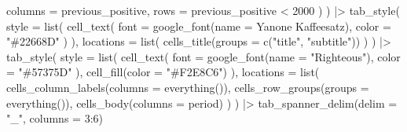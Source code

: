 \documentclass[
]{article}
\newenvironment{Shaded}{\begin{snugshade}}{\end{snugshade}}
\newcommand{\AttributeTok}[1]{\textcolor[rgb]{0.77,0.63,0.00}{#1}}
\newcommand{\DecValTok}[1]{\textcolor[rgb]{0.00,0.00,0.81}{#1}}
\newcommand{\FunctionTok}[1]{\textcolor[rgb]{0.00,0.00,0.00}{#1}}
\newcommand{\NormalTok}[1]{#1}
\newcommand{\SpecialCharTok}[1]{\textcolor[rgb]{0.00,0.00,0.00}{#1}}
\newcommand{\StringTok}[1]{\textcolor[rgb]{0.31,0.60,0.02}{#1}}
\begin{document}
\begin{Shaded}
\begin{Highlighting}[]
      \AttributeTok{columns =}\NormalTok{ previous\_positive,}
      \AttributeTok{rows =}\NormalTok{ previous\_positive }\SpecialCharTok{\textless{}} \DecValTok{2000}
\NormalTok{    )}
\NormalTok{  ) }\SpecialCharTok{|\textgreater{}} 
  \FunctionTok{tab\_style}\NormalTok{(}
      \AttributeTok{style =} \FunctionTok{list}\NormalTok{(}
        \FunctionTok{cell\_text}\NormalTok{(}
          \AttributeTok{font =} \FunctionTok{google\_font}\NormalTok{(}\AttributeTok{name =} \StringTok{\textquotesingle{}Yanone Kaffeesatz\textquotesingle{}}\NormalTok{), }
          \AttributeTok{color =} \StringTok{"\#22668D"}
\NormalTok{        )}
\NormalTok{      ),}
      \AttributeTok{locations =} \FunctionTok{list}\NormalTok{(}
        \FunctionTok{cells\_title}\NormalTok{(}\AttributeTok{groups =} \FunctionTok{c}\NormalTok{(}\StringTok{"title"}\NormalTok{, }\StringTok{"subtitle"}\NormalTok{))}
\NormalTok{      )}
\NormalTok{  ) }\SpecialCharTok{|\textgreater{}} 
  \FunctionTok{tab\_style}\NormalTok{(}
    \AttributeTok{style =} \FunctionTok{list}\NormalTok{(}
      \FunctionTok{cell\_text}\NormalTok{(}
        \AttributeTok{font =} \FunctionTok{google\_font}\NormalTok{(}\AttributeTok{name =} \StringTok{"Righteous"}\NormalTok{),}
        \AttributeTok{color =} \StringTok{"\#57375D"}
\NormalTok{      ),}
      \FunctionTok{cell\_fill}\NormalTok{(}\AttributeTok{color =} \StringTok{"\#F2E8C6"}\NormalTok{)}
\NormalTok{    ),}
    \AttributeTok{locations =} \FunctionTok{list}\NormalTok{(}
      \FunctionTok{cells\_column\_labels}\NormalTok{(}\AttributeTok{columns =} \FunctionTok{everything}\NormalTok{()),}
      \FunctionTok{cells\_row\_groups}\NormalTok{(}\AttributeTok{groups =} \FunctionTok{everything}\NormalTok{()),}
      \FunctionTok{cells\_body}\NormalTok{(}\AttributeTok{columns =}\NormalTok{ period)}
\NormalTok{    )}
\NormalTok{  ) }\SpecialCharTok{|\textgreater{}} 
  \FunctionTok{tab\_spanner\_delim}\NormalTok{(}\AttributeTok{delim =} \StringTok{"\_"}\NormalTok{, }\AttributeTok{columns =} \DecValTok{3}\SpecialCharTok{:}\DecValTok{6}\NormalTok{)}
\end{Highlighting}
\end{Shaded}
\end{document}
